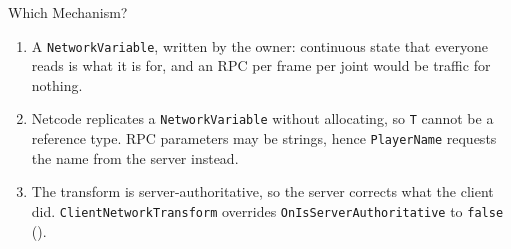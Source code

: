 \begin{solutionframe}{Which Mechanism?}
  \begin{enumerate}
    \item A \texttt{NetworkVariable}, written by the owner: continuous state
      that everyone reads is what it is for, and an RPC per frame per joint
      would be traffic for nothing.
    \item Netcode replicates a \texttt{NetworkVariable} without allocating, so
      \texttt{T} cannot be a reference type. RPC parameters may be strings,
      hence \texttt{PlayerName} requests the name from the server instead.
    \item The transform is server-authoritative, so the server corrects what
      the client did. \texttt{ClientNetworkTransform} overrides
      \texttt{OnIsServerAuthoritative} to \texttt{false}
      ().
  \end{enumerate}
\end{solutionframe}
